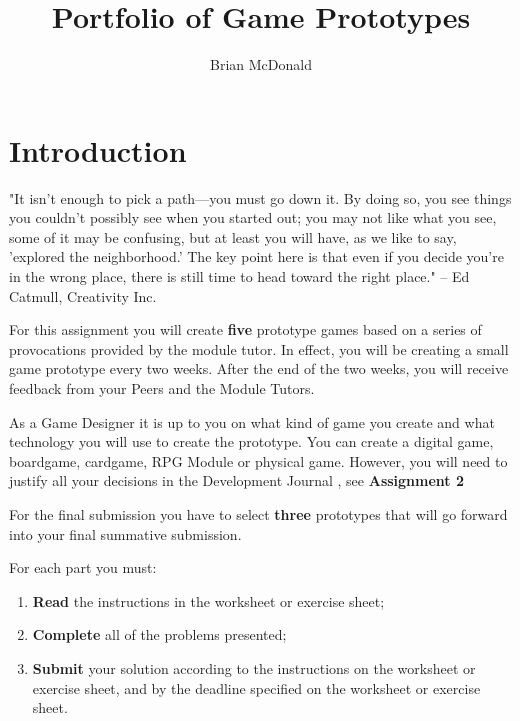 \documentclass{../../fal_assignment}
\title{Portfolio of Game Prototypes}
\author{Brian McDonald}
\begin{document}
\maketitle

\section*{Introduction}

\begin{marginquote}
"It isn't enough to pick a path—you must go down it. By doing so, you see things you couldn't possibly see when you started out; you may not like what you see, some of it may be confusing, but at least you will have, as we like to say, 'explored the neighborhood.' The key point here is that even if you decide you're in the wrong place, there is still time to head toward the right place."
-- Ed Catmull, Creativity Inc.

\end{marginquote}

For this assignment you will create \textbf{five} prototype games based on a series of provocations provided by the module tutor. In effect, you will be creating a small game prototype every two weeks. After the end of the two weeks, you will receive feedback from your Peers and the Module Tutors.

As a Game Designer it is up to you on what kind of game you create and what technology you will use to create the prototype. You can create a digital game, boardgame, cardgame, RPG Module or physical game. However, you will need to justify all your decisions in the Development Journal , see \textbf{Assignment 2}

For the final submission you have to select \textbf{three} prototypes that will go forward into your final summative submission.

For each part you must:
\begin{enumerate}[label=(\roman*)]
    \item \textbf{Read} the instructions in the worksheet or exercise sheet;
    \item \textbf{Complete} all of the problems presented;
    \item \textbf{Submit} your solution according to the instructions on the worksheet or exercise sheet, and by the deadline specified on the worksheet or exercise sheet.
\end{enumerate}
\end{document}
